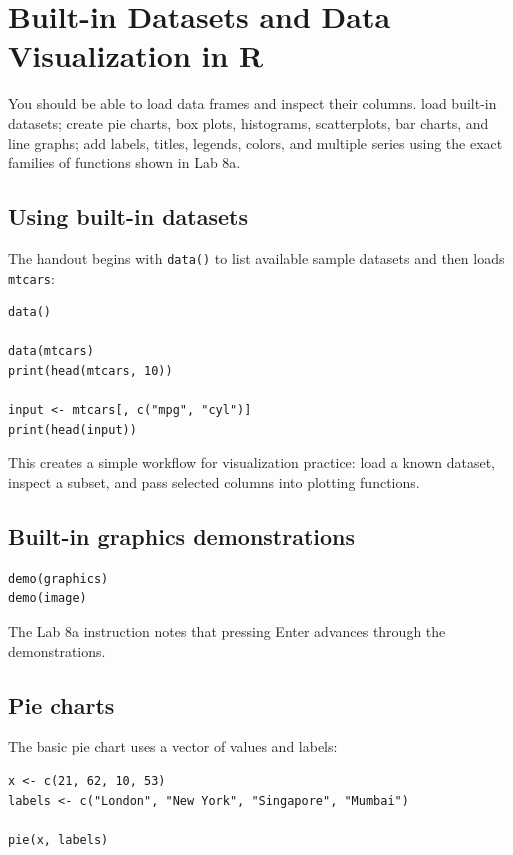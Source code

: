 \chapter{Built-in Datasets and Data Visualization in R}
\label{chap:visualization}

\chapterguide
  {You should be able to load data frames and inspect their columns.}
  {load built-in datasets; create pie charts, box plots, histograms, scatterplots, bar charts, and line graphs; add labels, titles, legends, colors, and multiple series using the exact families of functions shown in Lab 8a.}

\section{Using built-in datasets}

The handout begins with \texttt{data()} to list available sample datasets and then loads \texttt{mtcars}:

\begin{lstlisting}[style=dsr]
data()

data(mtcars)
print(head(mtcars, 10))

input <- mtcars[, c("mpg", "cyl")]
print(head(input))
\end{lstlisting}

This creates a simple workflow for visualization practice: load a known dataset, inspect a subset, and pass selected columns into plotting functions.

\section{Built-in graphics demonstrations}

\begin{lstlisting}[style=dsr]
demo(graphics)
demo(image)
\end{lstlisting}

The Lab 8a instruction notes that pressing Enter advances through the demonstrations.

\section{Pie charts}

The basic pie chart uses a vector of values and labels:

\begin{lstlisting}[style=dsr]
x <- c(21, 62, 10, 53)
labels <- c("London", "New York", "Singapore", "Mumbai")

pie(x, labels)
\end{lstlisting}

